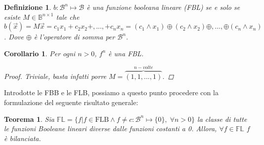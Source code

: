 \documentclass[12pt,a4paper,openright]{report}
\newcommand*\xor{\mathbin{\oplus}}
\newtheorem{mydef}{Definizione}[chapter]
\newtheorem*{mycor}{Corollario}
\newtheorem{mythm}{Teorema}
\begin{document}
\begin{mydef}
$b:\mathcal{B}^n \mapsto \mathcal{B}$ è una funzione booleana lineare (FBL) se e solo se esiste $M \in \mathbb{B}^{n \times 1}$ tale che $b(\vec{x})=M\vec{x}=c_1x_1+c_2x_2+,...,+c_nx_n=(c_1\land{x_1})\xor(c_2\land{x_2})\xor,...,\xor(c_n\land{x_n})$. Dove $\xor$
è l'operatore di somma per $\mathcal{B}^n$. 
\end{mydef}
\begin{mycor}
    Per ogni $n>0$, $f^n$ è una FBL.
    \begin{proof}
        Triviale, basta infatti porre $M=\overbrace{(1,1,...,1)}^{n-volte}$.
    \end{proof}
\end{mycor}

Introdotte le FBB e le FLB, possiamo a questo punto procedere con la formulazione del seguente risultato generale:
\begin{mythm}
    Sia $\mathbb{FL}=\{f|f\in\text{FLB} \land f \neq c:\mathcal{B}^n\mapsto\{0\},\;\forall n > 0\}$ la classe di tutte le funzioni Booleane lineari
    diverse dalle funzioni costanti a 0. Allora, $\forall f\in \mathbb{FL}$ $f$ è bilanciata.
\end{mythm}
\end{document}
